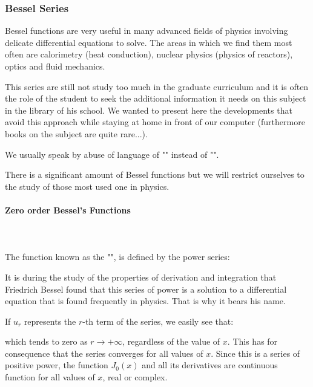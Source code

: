 	\pagebreak
	\subsubsection{Bessel Series}
	Bessel functions are very useful in many advanced fields of physics involving delicate differential equations to solve. The areas in which we find them most often are calorimetry (heat conduction), nuclear physics (physics of reactors), optics and fluid mechanics.
	
	This series are still not study too much in the graduate curriculum and it is often the role of the student to seek the additional information it needs on this subject in the library of his school. We wanted to present here the developments that avoid this approach while staying at home in front of our computer (furthermore books on the subject are quite rare...).
	
	\begin{tcolorbox}[title=Remark,colframe=black,arc=10pt]
	We usually speak by abuse of language of "" instead of "".
	\end{tcolorbox}
	There is a significant amount of Bessel functions but we will restrict ourselves to the study of those most used one in physics.
	
	\paragraph{Zero order Bessel's Functions}\mbox{}\\\\
	The function known as the "", is defined by the power series:
	
	It is during the study of the properties of derivation and integration that Friedrich Bessel found that this series of power is a solution to a differential equation that is found frequently in physics. That is why it bears his name.
	
	If $u_r$ represents the $r$-th term of the series, we easily see that:
	
	which tends to zero as $r\rightarrow +\infty$, regardless of the value of $x$. This has for consequence that the series converges for all values of $x$. Since this is a series of positive power, the function $J_0(x)$ and all its derivatives are continuous function for all values of $x$, real or complex.
	
